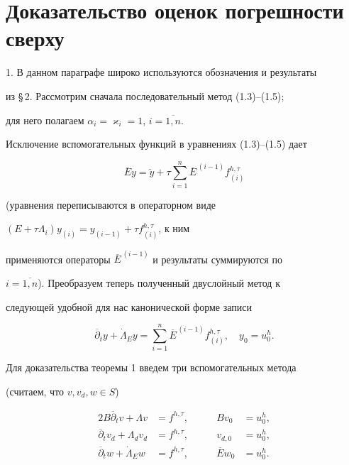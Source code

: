 \section{Доказательство оценок погрешности сверху}





1. В данном параграфе широко используются обозначения и результаты 


из \S\,2. Рассмотрим сначала последовательный метод (1.3)--(1.5); 


для него полагаем $\alpha_i=\varkappa_i=1$, $i=\overline{1,n}$.


Исключение вспомогательных функций в уравнениях (1.3)--(1.5) дает


$$


\overline Ey=\check y+\tau\sum_{i=1}^n\overline E^{\,(i-1)}f_{(i)}^{h,\tau}


$$


(уравнения переписываются в операторном виде


$(E+\tau\Lambda_i)y_{(i)}=y_{(i-1)}+\tau f_{(i)}^{h,\tau}$, к ним


применяются операторы $\overline E^{\,(i-1)}$ и результаты суммируются по 


$i=\overline{1,n}$). Преобразуем теперь полученный двуслойный метод к


следующей удобной для нас канонической форме записи


\begin{equation}


\overline\partial_ty+\Dot\Lambda_E y=\sum_{i=1}^n\overline E^{\,(i-1)}


f_{(i)}^{h,\tau},\quad y_0=u_0^h.


\end{equation}





Для доказательства теоремы 1 введем три вспомогательных метода 


(считаем, что $v,v_d,w\in S$)


\begin{alignat}{2}


B{\overline\partial}_t v+\Lambda v &=f^{h,\tau}, &\qquad Bv_0&=u_0^h,\\


%


{\overline\partial}_t v_d+\Lambda_d v_d &=f^{h,\tau},&\qquad v_{d,0}&=u_0^h,\\


%


{\overline\partial}_t w+\dot\Lambda_E w &=f^{h,\tau},


&\qquad {\overline E}w_0&=u_0^h.


\end{alignat}


